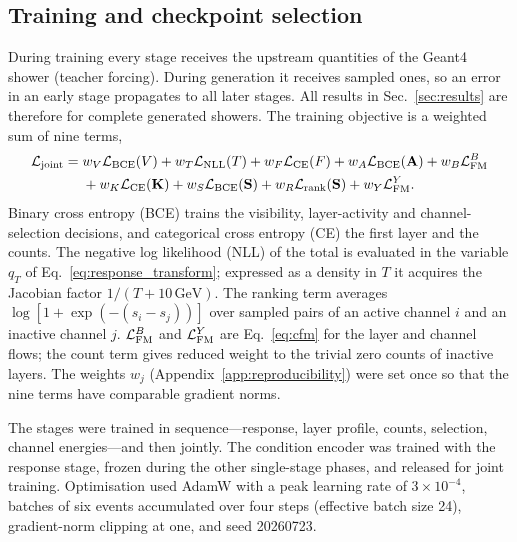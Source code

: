 \documentclass[11pt]{article}
\newcommand{\GeV}{\,\mathrm{GeV}}
\begin{document}
\subsection{Training and checkpoint selection}

During training every stage receives the upstream quantities of the Geant4 shower (teacher forcing). During generation it receives sampled ones, so an error in an early stage propagates to all later stages. All results in Sec.~\ref{sec:results} are therefore for complete generated showers. The training objective is a weighted sum of nine terms,
\begin{equation}
 \begin{aligned}
 \mathcal L_{\rm joint}={}&w_V\mathcal L_{\rm BCE}(V)
 +w_T\mathcal L_{\rm NLL}(T)
 +w_F\mathcal L_{\rm CE}(F)
 +w_A\mathcal L_{\rm BCE}(\mathbf A)
 +w_B\mathcal L_{\rm FM}^{B}\\
 &+w_K\mathcal L_{\rm CE}(\mathbf K)
 +w_S\mathcal L_{\rm BCE}(\mathbf S)
 +w_R\mathcal L_{\rm rank}(\mathbf S)
 +w_Y\mathcal L_{\rm FM}^{Y}.
 \end{aligned}
 \label{eq:joint_loss}
\end{equation}
Binary cross entropy (BCE) trains the visibility, layer-activity and channel-selection decisions, and categorical cross entropy (CE) the first layer and the counts. The negative log likelihood (NLL) of the total is evaluated in the variable $q_T$ of Eq.~\eqref{eq:response_transform}; expressed as a density in $T$ it acquires the Jacobian factor $1/(T+10\GeV)$. The ranking term averages $\log[1+\exp(-(s_i-s_j))]$ over sampled pairs of an active channel $i$ and an inactive channel $j$. $\mathcal L_{\rm FM}^{B}$ and $\mathcal L_{\rm FM}^{Y}$ are Eq.~\eqref{eq:cfm} for the layer and channel flows; the count term gives reduced weight to the trivial zero counts of inactive layers. The weights $w_j$ (Appendix~\ref{app:reproducibility}) were set once so that the nine terms have comparable gradient norms.

The stages were trained in sequence---response, layer profile, counts, selection, channel energies---and then jointly. The condition encoder was trained with the response stage, frozen during the other single-stage phases, and released for joint training. Optimisation used AdamW with a peak learning rate of $3\times10^{-4}$, batches of six events accumulated over four steps (effective batch size 24), gradient-norm clipping at one, and seed 20260723.
\end{document}
